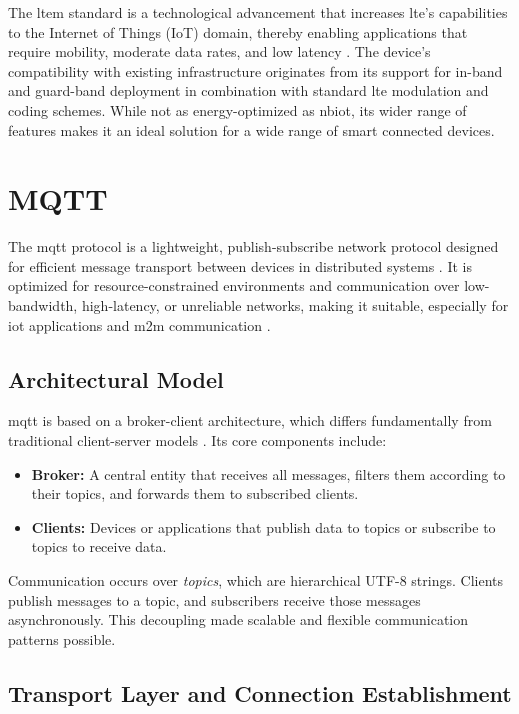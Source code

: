 \documentclass[12pt, english, openany]{book}
\begin{document}
The \gls{ltem} standard is a technological advancement that increases \gls{lte}'s capabilities to the Internet of Things (IoT) domain, thereby enabling applications that require mobility, moderate data rates, and low latency \parencite{LTE_SYSTEM}. The device's compatibility with existing infrastructure originates from its support for in-band and guard-band deployment in combination with standard \gls{lte} modulation and coding schemes. While not as energy-optimized as \gls{nbiot}, its wider range of features makes it an ideal solution for a wide range of smart connected devices.

\section{MQTT} \label{sec:mqtt}

The \gls{mqtt} protocol is a lightweight, publish-subscribe network protocol designed for efficient message transport between devices in distributed systems \parencite{MQTT_WIKI}. It is optimized for resource-constrained environments and communication over low-bandwidth, high-latency, or unreliable networks, making it suitable, especially for \gls{iot} applications and \gls{m2m} communication \parencite{naik2017choice}.

\subsection{Architectural Model}

\gls{mqtt} is based on a broker-client architecture, which differs fundamentally from traditional client-server models \parencite{naik2017choice}. Its core components include:

\begin{itemize}
    \item \textbf{Broker:} A central entity that receives all messages, filters them according to their topics, and forwards them to subscribed clients.
    \item \textbf{Clients:} Devices or applications that publish data to topics or subscribe to topics to receive data.
\end{itemize}

Communication occurs over \textit{topics}, which are hierarchical UTF-8 strings. Clients publish messages to a topic, and subscribers receive those messages asynchronously. This decoupling made scalable and flexible communication patterns possible.

\subsection{Transport Layer and Connection Establishment}
\end{document}
